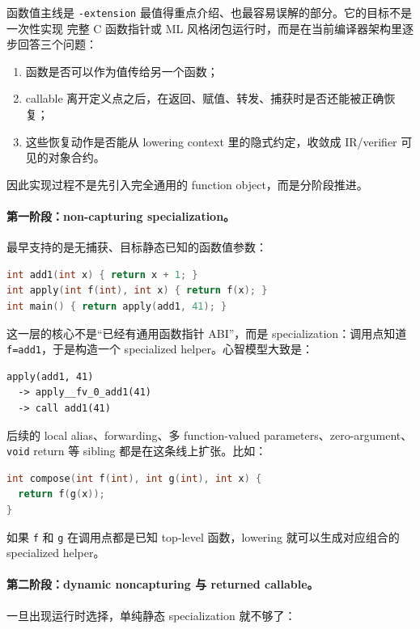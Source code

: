 \documentclass[UTF8,a4paper,11pt]{ctexart}
\begin{document}
函数值主线是 \texttt{-extension} 最值得重点介绍、也最容易误解的部分。它的目标不是一次性实现
完整 C 函数指针或 ML 风格闭包运行时，而是在当前编译器架构里逐步回答三个问题：

\begin{enumerate}[label=\arabic*.]
  \item 函数是否可以作为值传给另一个函数；
  \item callable 离开定义点之后，在返回、赋值、转发、捕获时是否还能被正确恢复；
  \item 这些恢复动作是否能从 lowering context 里的隐式约定，收敛成 IR/verifier 可见的对象合约。
\end{enumerate}

因此实现过程不是先引入完全通用的 function object，而是分阶段推进。

\paragraph{第一阶段：non-capturing specialization。}
最早支持的是无捕获、目标静态已知的函数值参数：

\begin{lstlisting}[language=C]
int add1(int x) { return x + 1; }
int apply(int f(int), int x) { return f(x); }
int main() { return apply(add1, 41); }
\end{lstlisting}

这一层的核心不是“已经有通用函数指针 ABI”，而是 specialization：调用点知道
\texttt{f=add1}，于是构造一个 specialized helper。心智模型大致是：

\begin{lstlisting}[language={}]
apply(add1, 41)
  -> apply__fv_0_add1(41)
  -> call add1(41)
\end{lstlisting}

后续的 local alias、forwarding、多 function-valued parameters、zero-argument、\texttt{void}
return 等 sibling 都是在这条线上扩张。比如：

\begin{lstlisting}[language=C]
int compose(int f(int), int g(int), int x) {
  return f(g(x));
}
\end{lstlisting}

如果 \texttt{f} 和 \texttt{g} 在调用点都是已知 top-level 函数，lowering 就可以生成对应组合的
specialized helper。

\paragraph{第二阶段：dynamic noncapturing 与 returned callable。}
一旦出现运行时选择，单纯静态 specialization 就不够了：
\end{document}
